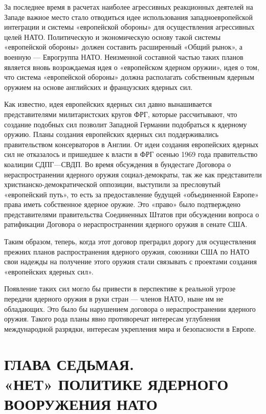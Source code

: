 \documentclass[12pt, a4paper, openany]{book}
\begin{document}
	За последнее время в расчетах наиболее агрессивных реакционных деятелей на Западе важное место стало отводиться идее использования западноевропейской интеграции и системы «европейской обороны» для осуществления агрессивных целей НАТО. Политическую и экономическую основу такой системы «европейской обороны» должен составить расширенный «Общий рынок», а военную — Еврогруппа НАТО. Неизменной составной частью таких планов является вновь возрождаемая идея о «европейском ядерном оружии», идея о том, что система «европейской обороны» должна располагать собственным ядерным оружием на основе английских и французских ядерных сил.
	
	Как известно, идея европейских ядерных сил давно вынашивается представителями милитаристских кругов ФРГ, которые рассчитывают, что создание подобных сил позволит Западной Германии подобраться к ядерному оружию. Планы создания европейских ядерных сил поддерживались правительством консерваторов в Англии. От идеи создания европейских ядерных сил не отказалось и пришедшее к власти в ФРГ осенью 1969 года правительство коалиции СДПГ—СВДП. Во время обсуждения в бундестаге Договора о нераспространении ядерного оружия социал-демократы, так же как представители христианско-демократической оппозиции, выступили за пресловутый «европейский путь», то есть за предоставление будущей «объединенной Европе» права иметь собственное ядерное оружие. Это «право» было подтверждено представителями правительства Соединенных Штатов при обсуждении вопроса о ратификации Договора о нераспространении ядерного оружия в сенате США.
	
	Таким образом, теперь, когда этот договор преградил дорогу для осуществления прежних планов распространения ядерного оружия, союзники США по НАТО свои надежды на получение этого оружия стали связывать с проектами создания «европейских ядерных сил».
	
	Появление таких сил могло бы привести в перспективе к реальной угрозе передачи ядерного оружия в руки стран — членов НАТО, ныне им не обладающих. Это было бы нарушением договора о нераспространении ядерного оружия. Такого рода планы явно противоречат интересам углубления международной разрядки, интересам укрепления мира и безопасности в Европе.
	
	
						\newpage
	\section[Глава седьмая. «НЕТ» ПОЛИТИКЕ ЯДЕРНОГО ВООРУЖЕНИЯ НАТО]{\center ГЛАВА СЕДЬМАЯ.\\ \textbf{«НЕТ» ПОЛИТИКЕ ЯДЕРНОГО ВООРУЖЕНИЯ НАТО}}	
\end{document}
